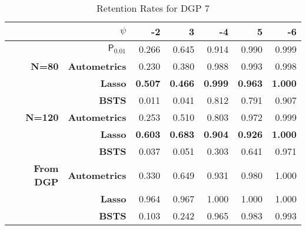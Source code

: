 \begin{table}[htbp]
  \centering

    \begin{tabular}{r|r|rrrrr}

          & \boldmath{}\textbf{$\psi$}\unboldmath{} & -2    & 3     & -4    & 5     & -6 \\
          \hline

          & $\mathsf{P}_{0.01}$ & 0.266 & 0.645 & 0.914 & 0.990 & 0.999  \\
          \hline
    \textbf{N=80} & \textbf{Autometrics} & 0.230 & 0.380 & 0.988 & 0.993 & 0.998 \\
    \textbf{} & \textbf{Lasso} & \textbf{0.507} & \textbf{0.466} & \textbf{0.999} & \textbf{0.963} & \textbf{1.000} \\
    \textbf{} & \textbf{BSTS} & 0.011 & 0.041 & 0.812 & 0.791 & 0.907 \\
    \hline
    \textbf{N=120} & \textbf{Autometrics} & 0.253 & 0.510 & 0.803 & 0.972 & 0.999 \\
    \textbf{} & \textbf{Lasso} & \textbf{0.603} & \textbf{0.683} & \textbf{0.904} & \textbf{0.926} & \textbf{1.000} \\
    \textbf{} & \textbf{BSTS} & 0.037 & 0.051 & 0.303 & 0.641 & 0.971 \\
    \hline
    \textbf{From DGP} & \textbf{Autometrics} & 0.330 & 0.649 & 0.931 & 0.980 & 1.000 \\
          & \textbf{Lasso} & 0.964 & 0.967 & 1.000 & 1.000 & 1.000 \\
          & \textbf{BSTS} & 0.103 & 0.242 & 0.965 & 0.983 & 0.993 \\

    \end{tabular}%
     \caption{Retention Rates for DGP 7}
  \label{DGP7RetRates}%
\end{table}%

